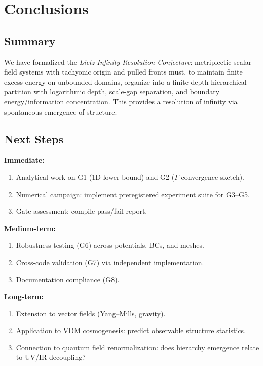 \documentclass{article}
\begin{document}
\section{Conclusions}
\label{sec:conclusions}

\subsection{Summary}

We have formalized the \emph{Lietz Infinity Resolution Conjecture}: metriplectic scalar-field systems with tachyonic origin and pulled fronts must, to maintain finite excess energy on unbounded domains, organize into a finite-depth hierarchical partition with logarithmic depth, scale-gap separation, and boundary energy/information concentration. This provides a resolution of infinity via spontaneous emergence of structure.

\subsection{Next Steps}

\textbf{Immediate:}
\begin{enumerate}
    \item Analytical work on G1 (1D lower bound) and G2 ($\Gamma$-convergence sketch).
    \item Numerical campaign: implement preregistered experiment suite for G3--G5.
    \item Gate assessment: compile pass/fail report.
\end{enumerate}

\textbf{Medium-term:}
\begin{enumerate}
    \item Robustness testing (G6) across potentials, BCs, and meshes.
    \item Cross-code validation (G7) via independent implementation.
    \item Documentation compliance (G8).
\end{enumerate}

\textbf{Long-term:}
\begin{enumerate}
    \item Extension to vector fields (Yang--Mills, gravity).
    \item Application to VDM cosmogenesis: predict observable structure statistics.
    \item Connection to quantum field renormalization: does hierarchy emergence relate to UV/IR decoupling?
\end{enumerate}
\end{document}
